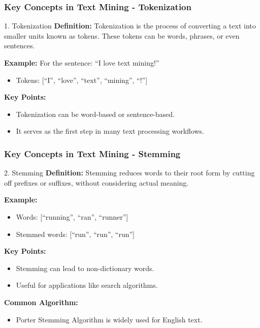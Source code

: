 \documentclass[aspectratio=169]{beamer}
\begin{document}
\begin{frame}[fragile]
    \frametitle{Key Concepts in Text Mining - Tokenization}
    \begin{block}{1. Tokenization}
        \textbf{Definition:} Tokenization is the process of converting a text into smaller units known as tokens. 
        These tokens can be words, phrases, or even sentences.

        \textbf{Example:} For the sentence: ``I love text mining!'' 
        \begin{itemize}
            \item Tokens: [``I'', ``love'', ``text'', ``mining'', ``!'']
        \end{itemize}
        
        \textbf{Key Points:}
        \begin{itemize}
            \item Tokenization can be word-based or sentence-based.
            \item It serves as the first step in many text processing workflows.
        \end{itemize}
    \end{block}
\end{frame}

\begin{frame}[fragile]
    \frametitle{Key Concepts in Text Mining - Stemming}
    \begin{block}{2. Stemming}
        \textbf{Definition:} Stemming reduces words to their root form by cutting off prefixes or suffixes, without considering actual meaning.

        \textbf{Example:}
        \begin{itemize}
            \item Words: [``running'', ``ran'', ``runner'']
            \item Stemmed words: [``run'', ``run'', ``run'']
        \end{itemize}
        
        \textbf{Key Points:}
        \begin{itemize}
            \item Stemming can lead to non-dictionary words.
            \item Useful for applications like search algorithms.
        \end{itemize}
        
        \textbf{Common Algorithm:} 
        \begin{itemize}
            \item Porter Stemming Algorithm is widely used for English text.
        \end{itemize}
    \end{block}
\end{frame}
\end{document}
